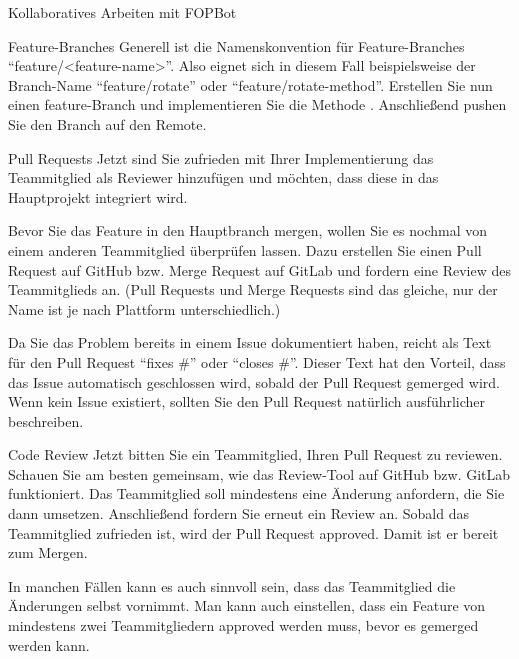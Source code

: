 \documentclass[
    english, accentcolor=TUDa-1c,
    fontsize= 12pt, a4paper, aspectratio=169, colorback=true, fancy_row_colors, boxarc=3pt,
]{algoexercise}
\begin{document}
\begin{task}{Kollaboratives Arbeiten mit FOPBot}
\begin{subtask*}[points=0]{Feature-Branches}
            Generell ist die Namenskonvention für Feature-Branches \enquote{feature/<feature-name>}. Also eignet sich in diesem Fall beispielsweise der Branch-Name \enquote{feature/rotate} oder \enquote{feature/rotate-method}.
            Erstellen Sie nun einen feature-Branch und implementieren Sie die Methode . Anschließend pushen Sie den Branch auf den Remote.
        \end{subtask*}
        \begin{subtask*}[points=0]{Pull Requests}
            Jetzt sind Sie zufrieden mit Ihrer Implementierung das Teammitglied als Reviewer hinzufügen und möchten, dass diese in das Hauptprojekt integriert wird.

            Bevor Sie das Feature in den Hauptbranch mergen, wollen Sie es nochmal von einem anderen Teammitglied überprüfen lassen. Dazu erstellen Sie einen Pull Request auf GitHub bzw. Merge Request auf GitLab und fordern eine Review des Teammitglieds an. (Pull Requests und Merge Requests sind das gleiche, nur der Name ist je nach Plattform unterschiedlich.)

            \begin{hinweis}
                Da Sie das Problem bereits in einem Issue dokumentiert haben, reicht als Text für den Pull Request \enquote{fixes \#<issue-number>} oder \enquote{closes \#<issue-number>}. Dieser Text hat den Vorteil, dass das Issue automatisch geschlossen wird, sobald der Pull Request gemerged wird. Wenn kein Issue existiert, sollten Sie den Pull Request natürlich ausführlicher beschreiben.
            \end{hinweis}
        \end{subtask*}
        \begin{subtask*}[points=0]{Code Review}
            Jetzt bitten Sie ein Teammitglied, Ihren Pull Request zu reviewen. Schauen Sie am besten gemeinsam, wie das Review-Tool auf GitHub bzw. GitLab funktioniert. Das Teammitglied soll mindestens eine Änderung anfordern, die Sie dann umsetzen. Anschließend fordern Sie erneut ein Review an. Sobald das Teammitglied zufrieden ist, wird der Pull Request approved. Damit ist er bereit zum Mergen.

            \begin{anmerkung}
                In manchen Fällen kann es auch sinnvoll sein, dass das Teammitglied die Änderungen selbst vornimmt. Man kann auch einstellen, dass ein Feature von mindestens zwei Teammitgliedern approved werden muss, bevor es gemerged werden kann.
            \end{anmerkung}
        \end{subtask*}
    \end{task}
\end{document}
